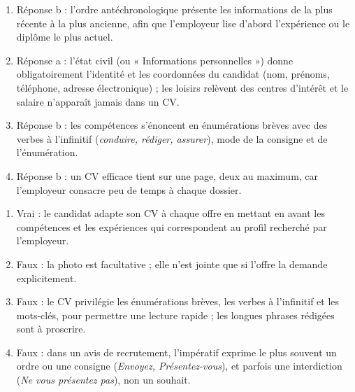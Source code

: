 \documentclass[11pt]{article}
\newcommand{\cle}[1]{{\popxbold\color{popdark}#1}}
\begin{document}
\begin{corrige}
\begin{enumerate}
\item Réponse b : l'ordre \cle{antéchronologique} présente les informations de la plus récente à la plus ancienne, afin que l'employeur lise d'abord l'expérience ou le diplôme le plus actuel.
\item Réponse a : l'état civil (ou « Informations personnelles ») donne obligatoirement l'identité et les coordonnées du candidat (nom, prénoms, téléphone, adresse électronique) ; les loisirs relèvent des centres d'intérêt et le salaire n'apparaît jamais dans un CV.
\item Réponse b : les compétences s'énoncent en énumérations brèves avec des verbes à l'\cle{infinitif} (\emph{conduire, rédiger, assurer}), mode de la consigne et de l'énumération.
\item Réponse b : un CV efficace tient sur une page, deux au maximum, car l'employeur consacre peu de temps à chaque dossier.
\end{enumerate}
\end{corrige}

\begin{corrige}
\begin{enumerate}
\item Vrai : le candidat adapte son CV à chaque offre en mettant en avant les compétences et les expériences qui correspondent au profil recherché par l'employeur.
\item Faux : la photo est facultative ; elle n'est jointe que si l'offre la demande explicitement.
\item Faux : le CV privilégie les énumérations brèves, les verbes à l'infinitif et les mots-clés, pour permettre une lecture rapide ; les longues phrases rédigées sont à proscrire.
\item Faux : dans un avis de recrutement, l'impératif exprime le plus souvent un ordre ou une consigne (\emph{Envoyez, Présentez-vous}), et parfois une interdiction (\emph{Ne vous présentez pas}), non un souhait.
\end{enumerate}
\end{corrige}
\end{document}

